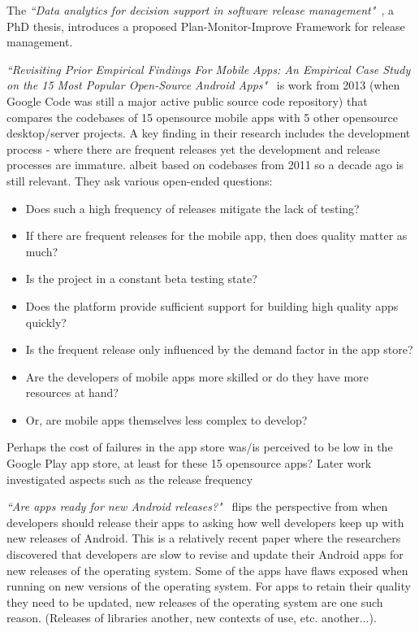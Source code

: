     
The \emph{``Data analytics for decision support in software release management"}~\cite{didar2018data_analytics_phd_thesis}, a PhD thesis, introduces a proposed Plan-Monitor-Improve Framework for release management.

\emph{``Revisiting Prior Empirical Findings For Mobile Apps: An Empirical Case Study on the 15 Most Popular Open-Source Android Apps"}~\cite{syer2013_empirical_findings_for_mobile_apps} is work from 2013 (when Google Code was still a major active public source code repository) that compares the codebases of 15 opensource mobile apps with 5 other opensource desktop/server projects. A key finding in their research includes the development process - where there are frequent releases yet the development and release processes are immature. albeit based on codebases from 2011 so a decade ago is still relevant. They ask various open-ended questions:
    \begin{itemize}
        \item Does such a high frequency of releases mitigate the lack of testing? 
        \item If there are frequent releases for the mobile app, then does quality matter as much?
        \item Is the project in a constant beta testing state? 
        \item Does the platform provide sufficient support for building high quality apps quickly? 
        \item Is the frequent release only influenced by the demand factor in the app store? 
        \item Are the developers of mobile apps more skilled or do they have more resources at hand? 
        \item Or, are mobile apps themselves less complex to develop?
    \end{itemize}
    
Perhaps the cost of failures in the app store was/is perceived to be low in the Google Play app store, at least for these 15 opensource apps? Later work investigated aspects such as the release frequency~

    
\emph{``Are apps ready for new Android releases?"}~\textcite{guilardi_are_apps_ready_for_new_android_releases} flips the perspective from when developers should release their apps to asking how well developers keep up with new releases of Android. This is a relatively recent paper where the researchers discovered that developers are slow to revise and update their Android apps for new releases of the operating system. Some of the apps have flaws exposed when running on new versions of the operating system. For apps to retain their quality they need to be updated, new releases of the operating system are one such reason. (Releases of libraries another, new contexts of use, etc. another...).



